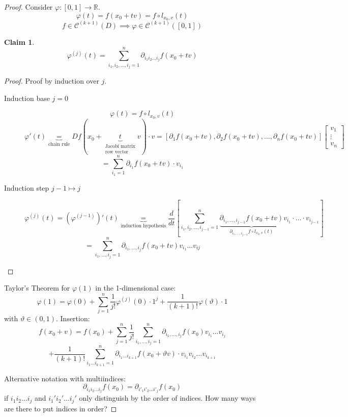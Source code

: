 \documentclass{article}
\newtheorem*{claim}{Claim}%
\begin{document}
\begin{proof}
  Consider $\varphi: [0,1] \to \mathbb R$.
  \[ \varphi(t) = f(x_0 + tv) = f \circ l_{x_0,v}(t) \]
  \[ f \in \mathcal C^{(k+1)}(D) \implies \varphi \in \mathcal C^{(k+1)}([0,1]) \]
  \begin{claim}
    \[ \varphi^{(j)}(t) = \sum_{i_1,i_2,\dots,i_j=1}^n \partial_{i_1 i_2 \dots i_j} f(x_0 + tv) \]
  \end{claim}
  \begin{proof}
    Proof by induction over $j$.
    \begin{description}
      \item[Induction base $j = 0$]
        \[ \varphi(t) = f \circ l_{x_0,v}(t) \]
        \[ \varphi'(t) \underbrace{=}_{\text{chain rule}} Df(x_0 + \underbrace{t}_{\substack{\text{Jacobi matrix} \\ \text{row vector}}}v) \cdot v = [\partial_1 f(x_0 + tv), \partial_2 f(x_0 + tv), \dots, \partial_n f(x_0 + tv)]\begin{bmatrix} v_1 \\ \vdots \\ v_n \end{bmatrix} \]
        \[ = \sum_{i_1=1}^n \partial_{i_1} f(x_0 + tv) \cdot v_{i_1} \]
      \item[Induction step $j-1 \mapsto j$]
        \[ \varphi^{(j)}(t) = (\varphi^{(j-1)})'(t) \underbrace{=}_{\text{induction hypothesis}} \frac{d}{dt} \left[\sum_{i_1,i_2,\dots,i_{j-1}=1}^n \underbrace{\partial_{i_1,\dots,i_{j-1}} f(x_0 + tv)}_{\partial_{i_1,\dots,i_{j-1}} f \circ l_{x_0,v}(t)} v_{i_1} \cdot \dots \cdot v_{i_{j-1}} \right] \]
        \[ = \sum_{i_1,\dots,i_j = 1}^n \partial_{i_1, \dots, i_j} f(x_0 + tv) v_{i_1} \dots v_{ij} \]
    \end{description}
  \end{proof}
  Taylor's Theorem for $\varphi(1)$ in the 1-dimensional case:
  \[ \varphi(1) = \varphi(0) + \sum_{j=1}^n \frac{1}{j!} \varphi^{(j)}(0) \cdot 1^j + \frac{1}{(k+1)!} \varphi (\vartheta) \cdot 1 \]
  with $\vartheta \in (0,1)$.
  Insertion:
  \[ f(x_0 + v) = f(x_0) + \sum_{j=1}^n \frac{1}{j!} \sum_{i_1,\dots,i_j=1}^n \partial_{i_1,\dots,i_j} f(x_0) v_{i_1} \dots v_{i_j} \]
  \[ + \frac{1}{(k+1)!} \sum_{i_1 \dots i_{k+1}=1}^n \partial_{i_1 \dots i_{k+1}} f(x_0 + \vartheta v) \cdot v_{i_1} v_{i_2} \dots v_{i_{k+1}} \]

  Alternative notation with multiindices:
  \[ \partial_{i_1 i_2 \dots i_j} f(x_0) = \partial_{i'_1 i'_2 \dots i'_j} f(x_0) \]
  if $i_1 i_2 \dots i_j$ and $i_1' i_2' \dots i_j'$ only distinguish by the order of indices.
  How many ways are there to put indices in order?


\end{proof}
\end{document}
